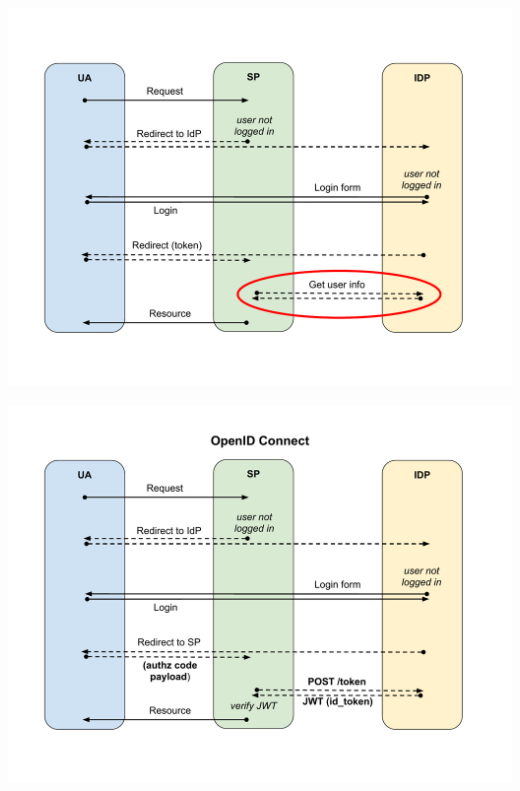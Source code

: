 \documentclass[ignorenonframetext,aspectratio=169]{beamer}
\begin{document}
\begin{frame}[plain]
\centering
\includegraphics[height=\paperheight]{fedsso-proto-6-getuserinfo.pdf}
\end{frame}

\begin{frame}[plain]
\centering
\includegraphics[height=\paperheight]{fedsso-security-oidc.pdf}
\end{frame}
\end{document}
